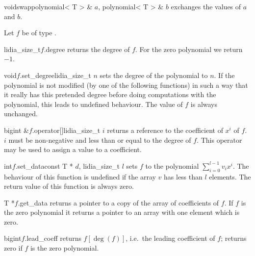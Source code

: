 \begin{fcode}{void}{swap}{polynomial< T > & $a$, polynomial< T > & $b$}
  exchanges the values of $a$ and $b$.
\end{fcode}



\ACCS

Let $f$ be of type .

\begin{cfcode}{lidia_size_t}{$f$.degree}{}
  returns the degree of $f$.  For the zero polynomial we return $-1$.
\end{cfcode}

\begin{fcode}{void}{$f$.set_degree}{lidia_size_t $n$}
  sets the degree of the polynomial to $n$.  If the polynomial is not modified (by one of the
  following functions) in such a way that it really has this pretended degree before doing
  computations with the polynomial, this leads to undefined behaviour.  The value of $f$ is
  always unchanged.
\end{fcode}

\begin{fcode}{bigint &}{$f$.operator[]}{lidia_size_t $i$}
  returns a reference to the coefficient of $x^i$ of $f$.  $i$ must be non-negative and less
  than or equal to the degree of $f$.  This operator may be used to assign a value to a
  coefficient.
\end{fcode}

\begin{fcode}{int}{$f$.set_data}{const T * $d$, lidia_size_t $l$}
  sets $f$ to the polynomial $\sum_{i=0}^{l-1} v_i x^i$.  The behaviour of this function is
  undefined if the array $v$ has less than $l$ elements. The return value of
  this function is always zero.
\end{fcode}

\begin{cfcode}{T *}{$f$.get_data}{}
  returns a pointer to a copy of the array of coefficients of $f$.  If $f$ is the zero
  polynomial it returns a pointer to an array with one element which is zero.
\end{cfcode}

\begin{cfcode}{bigint}{$f$.lead_coeff}{}
  returns $f[\deg(f)]$, i.e.~the leading coefficient of $f$; returns zero if $f$ is the zero
  polynomial.
\end{cfcode}

